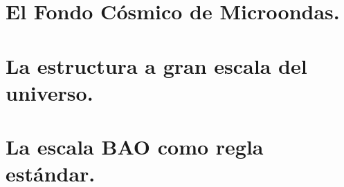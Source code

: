 \section{El Fondo Cósmico de Microondas.}

\section{La estructura a gran escala del universo.}

\section{La escala BAO como regla estándar.}





%
%
%
%
